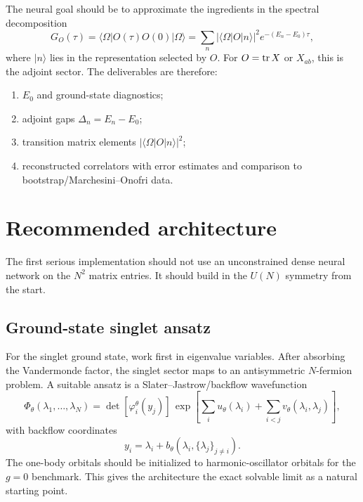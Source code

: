 \documentclass[11pt]{article}
\begin{document}
The neural goal should be to approximate the ingredients in the spectral
decomposition
\begin{equation}
  G_O(\tau)
  =
  \langle \Omega|O(\tau)O(0)|\Omega\rangle
  =
  \sum_n |\langle \Omega|O|n\rangle|^2
  e^{-(E_n-E_0)\tau},
\end{equation}
where \(|n\rangle\) lies in the representation selected by \(O\).  For
\(O={\rm tr}\,X\) or \(X_{ab}\), this is the adjoint sector.  The deliverables
are therefore:
\begin{enumerate}
  \item \(E_0\) and ground-state diagnostics;
  \item adjoint gaps \(\Delta_n=E_n-E_0\);
  \item transition matrix elements \(|\langle \Omega|O|n\rangle|^2\);
  \item reconstructed correlators with error estimates and comparison to
        bootstrap/Marchesini--Onofri data.
\end{enumerate}

\section{Recommended architecture}

The first serious implementation should not use an unconstrained dense neural
network on the \(N^2\) matrix entries.  It should build in the \(U(N)\) symmetry
from the start.

\subsection{Ground-state singlet ansatz}

For the singlet ground state, work first in eigenvalue variables.  After
absorbing the Vandermonde factor, the singlet sector maps to an antisymmetric
\(N\)-fermion problem.  A suitable ansatz is a Slater--Jastrow/backflow
wavefunction
\begin{equation}
  \Phi_\theta(\lambda_1,\ldots,\lambda_N)
  =
  \det[\varphi_i^\theta(y_j)]\,
  \exp\!\left[
    \sum_i u_\theta(\lambda_i)
    + \sum_{i<j} v_\theta(\lambda_i,\lambda_j)
  \right],
\end{equation}
with backflow coordinates
\begin{equation}
  y_i = \lambda_i + b_\theta(\lambda_i,\{\lambda_j\}_{j\ne i}).
\end{equation}
The one-body orbitals should be initialized to harmonic-oscillator orbitals for
the \(g=0\) benchmark.  This gives the architecture the exact solvable limit as
a natural starting point.
\end{document}
